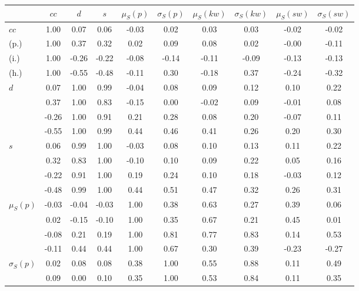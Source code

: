 \begin{table*}[h!]
\begin{center}
\begin{tabular}{| l | c | c | c | c | c | c | c | c | c |}\hline
 & $cc$ & $d$ & $s$ & $\mu_S(p)$ & $\sigma_S(p)$ & $\mu_S(kw)$ & $\sigma_S(kw)$ & $\mu_S(sw)$ & $\sigma_S(sw)$ \\\hline
$cc$ & 1.00  & 0.07  & 0.06  & -0.03  & 0.02  & 0.03  & 0.03  & -0.02  & -0.02 \\\hline
(p.) & 1.00  & 0.37  & 0.32  & 0.02  & 0.09  & 0.08  & 0.02  & -0.00  & -0.11 \\\hline
(i.) & 1.00  & -0.26  & -0.22  & -0.08  & -0.14  & -0.11  & -0.09  & -0.13  & -0.13 \\\hline
(h.) & 1.00  & -0.55  & -0.48  & -0.11  & 0.30  & -0.18  & 0.37  & -0.24  & -0.32 \\\hline
$d$ & 0.07  & 1.00  & 0.99  & -0.04  & 0.08  & 0.09  & 0.12  & 0.10  & 0.22 \\\hline
 & 0.37  & 1.00  & 0.83  & -0.15  & 0.00  & -0.02  & 0.09  & -0.01  & 0.08 \\\hline
 & -0.26  & 1.00  & 0.91  & 0.21  & 0.28  & 0.08  & 0.20  & -0.07  & 0.11 \\\hline
 & -0.55  & 1.00  & 0.99  & 0.44  & 0.46  & 0.41  & 0.26  & 0.20  & 0.30 \\\hline
$s$ & 0.06  & 0.99  & 1.00  & -0.03  & 0.08  & 0.10  & 0.13  & 0.11  & 0.22 \\\hline
 & 0.32  & 0.83  & 1.00  & -0.10  & 0.10  & 0.09  & 0.22  & 0.05  & 0.16 \\\hline
 & -0.22  & 0.91  & 1.00  & 0.19  & 0.24  & 0.10  & 0.18  & -0.03  & 0.12 \\\hline
 & -0.48  & 0.99  & 1.00  & 0.44  & 0.51  & 0.47  & 0.32  & 0.26  & 0.31 \\\hline
$\mu_S(p)$ & -0.03  & -0.04  & -0.03  & 1.00  & 0.38  & 0.63  & 0.27  & 0.39  & 0.06 \\\hline
 & 0.02  & -0.15  & -0.10  & 1.00  & 0.35  & 0.67  & 0.21  & 0.45  & 0.01 \\\hline
 & -0.08  & 0.21  & 0.19  & 1.00  & 0.81  & 0.77  & 0.83  & 0.14  & 0.53 \\\hline
 & -0.11  & 0.44  & 0.44  & 1.00  & 0.67  & 0.30  & 0.39  & -0.23  & -0.27 \\\hline
$\sigma_S(p)$ & 0.02  & 0.08  & 0.08  & 0.38  & 1.00  & 0.55  & 0.88  & 0.11  & 0.49 \\\hline
 & 0.09  & 0.00  & 0.10  & 0.35  & 1.00  & 0.53  & 0.84  & 0.11  & 0.35 \\\hline

\end{tabular}
\end{center}
\end{table*}
